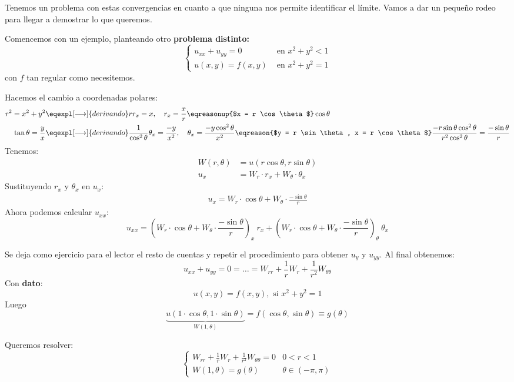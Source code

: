 		Tenemos un problema con estas convergencias en cuanto a que ninguna nos permite identificar el límite. Vamos a dar un pequeño rodeo para llegar a demostrar lo que queremos.

		Comencemos con un ejemplo, planteando otro \textbf{problema distinto:}
		\[
			\begin{cases}
				u_{xx} + u_{yy} = 0 & \text{ en } x^2 + y^2 < 1 \\
				u(x,y) = f(x,y) & \text{ en } x^2 + y^2 = 1
			\end{cases}
		\]
		con $f$ tan regular como necesitemos.

		Hacemos el cambio a coordenadas polares:
		\begin{align*}
		 r^2 = x^2 + y^2  &\eqexpl[\longrightarrow]{derivando} rr_x = x , \quad r_x = \frac{x}{r} \eqreasonup{$x = r \cos \theta $} \cos \theta \\
		 \tan \theta = \frac{y}{x}  &\eqexpl[\longrightarrow]{derivando} \frac{1}{\cos^2 \theta} \theta_x = \frac{-y}{x^2}, \quad \theta_x = \frac{-y \cos^2\theta}{x^2} \eqreason{$y = r \sin \theta, x = r \cos \theta$} \frac{-r \sin \theta \cos^2 \theta}{r^2 \cos^2 \theta} = \frac{- \sin \theta}{r}
		\end{align*}
		Tenemos:
		\begin{align*}
			W(r, \theta) &= u(r \cos \theta, r \sin \theta)\\
			u_x &= W_r \cdot r_x + W_\theta \cdot \theta_x
		\end{align*}
		Sustituyendo $r_x$ y $\theta_x$ en $u_x$:
		\begin{align*}
			u_x = W_r \cdot \cos \theta + W_\theta \cdot \frac{- \sin \theta}{r}
		\end{align*}
		Ahora podemos calcular $u_{xx}$:
		$$ u_{xx} = (W_r \cdot \cos \theta + W_\theta \cdot \frac{- \sin \theta}{r})_x \ r_x + (W_r \cdot \cos \theta + W_\theta \cdot \frac{- \sin \theta}{r})_\theta \ \theta_x$$

		Se deja como ejercicio para el lector el resto de cuentas y repetir el procedimiento para obtener $u_y$ y $u_{yy}$. Al final obtenemos:
		$$ u_{xx} + u_{yy} = 0 = \dots = W_{rr} + \frac{1}{r}W_r + \frac{1}{r^2}W_{\theta\theta}$$
		Con \textbf{dato}:
		\[ u(x,y) = f(x,y), \text{ si } x^2 + y^2 = 1\]
		Luego
		\[ \underbrace{u(1 \cdot \cos \theta,1 \cdot \sin \theta)}_{W(1,\theta)} = f(\cos \theta, \sin \theta) \equiv g(\theta)\]

		Queremos resolver:
		\[
			\begin{cases}
			W_{rr} + \frac{1}{r} W_r + \frac{1}{r^2} W_{\theta \theta} = 0 & 0 < r < 1 \\
			W(1, \theta) = g(\theta) & \theta \in (-\pi,\pi)
			\end{cases}
		\]

